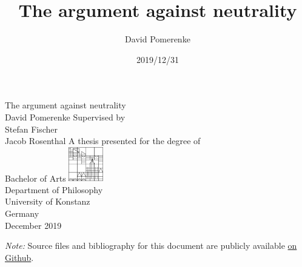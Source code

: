 \documentclass{report}
\title{The argument against neutrality}
\author{David Pomerenke}
\date{2019/12/31}
\begin{document}
\begin{titlepage}
    \begin{center}
        \vspace*{1cm}
        \huge
        The argument against neutrality\\
        \large
        David Pomerenke
        \vfill
        Supervised by\\
        Stefan Fischer\\
        Jacob Rosenthal
        \vfill
        A thesis presented for the degree of\\
        Bachelor of Arts
        \vfill
        \includegraphics[width=1.5cm]{0-logo}\\
        Department of Philosophy\\
        University of Konstanz\\
        Germany\\
        December 2019
    \end{center}
\end{titlepage}

\tableofcontents














\emph{Note:} Source files and bibliography for this document are publicly available \href{https://github.com/davidpomerenke/ba}{on Github}.
\end{document}
